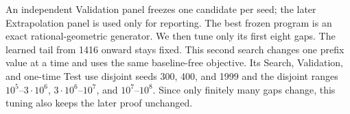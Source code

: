 An independent Validation panel freezes one candidate per seed; the later
Extrapolation panel is used only for reporting.  The best frozen program is an
exact rational-geometric generator.  We then tune only its first eight gaps.
The learned tail from 1416 onward stays fixed.  This second search changes one
prefix value at a time and uses the same baseline-free objective.  Its Search,
Validation, and one-time Test use disjoint seeds 300, 400, and 1999 and the
disjoint ranges $10^5$--$3\cdot10^6$, $3\cdot10^6$--$10^7$, and
$10^7$--$10^8$.  Since only finitely many gaps change, this tuning also keeps
the later proof unchanged.
